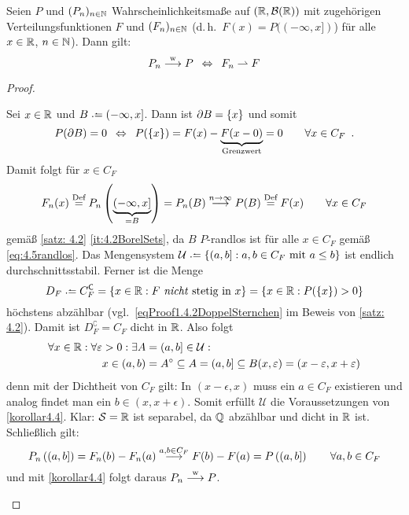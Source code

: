 \begin{korollar}\label{korollar4.5}
	Seien $P$ und $(P_n)_{n\in\mathbb{N}}$ Wahrscheinlichkeitsmaße auf $(\mathbb{R}, \mathcal{B}(\mathbb{R}))$ mit zugehörigen Verteilungsfunktionen $F$ und $(F_n)_{n\in\mathbb{N}}$ (d.\,h.\ $F(x) = P((-\infty, x])$) für alle $x \in \mathbb{R}$, $n \in \mathbb{N}$).
	Dann gilt:
	\begin{equation*}
		P_n \mathrel{\overset{\text{w}}{\longrightarrow}} P
		\enskip \Leftrightarrow \enskip
		F_n \rightharpoonup F
	\end{equation*}
\end{korollar}

\begin{proof}
	\begin{description}
		\hinrichtung
		Sei $x\in\mathbb{R}$ und $B\defeq(-\infty,x]$. Dann ist $\partial B = \left\{ x \right\}$ und somit
		\begin{equation}\label{eq:4.5randlos}
			P(\partial B) = 0
			\enskip \Leftrightarrow \enskip P(\left\{  x \right\})=F(x)-\underbrace{F(x-0)}_{\text{Grenzwert}}=0
			\qquad\forall x\in C_F \enskip \text{.}
		\end{equation}
		Damit folgt für $x\in C_F$
		\begin{equation*}
			F_n(x) \overset{\text{Def}}{=}
			P_n\left( \underbrace{(-\infty,x]}_{=B} \right)
			= P_n(B) \overset{n \to \infty}{\longrightarrow}  P(B) 
			\overset{\text{Def}}{=} F(x) \qquad\forall x\in C_F
		\end{equation*}
		gemäß \cref{satz: 4.2} \ref{it:4.2BorelSets}, da $B$ $P$-randlos ist für alle $x \in C_F$ gemäß \eqref{eq:4.5randlos}.
		\rueckrichtung
		Das Mengensystem $\mathcal{U} \defeq \menge{ (a,b] : a, b \in C_F \mit a \le b}$ ist endlich durchschnittsstabil. Ferner ist die Menge
		\begin{equation*}
			D_F \defeq C_F^\complement = \menge{ x\in\R: F\text{ \textit{nicht} stetig in }x}
			= \menge{ x\in\R:P(\menge{ x})>0}
		\end{equation*}
		höchstens abzählbar (vgl.\ \eqref{eqProof1.4.2DoppelSternchen}
		im Beweis von \cref{satz: 4.2}). Damit ist $D_F^\complement = C_F$ dicht in $\mathbb{R}$.
		Also folgt
		\begin{align*}
			\forall x\in\mathbb{R}:\forall\varepsilon>0:\exists A&=(a,b]\in \mathcal{U}:\\
			x\in (a,b)&=A^\circ\subseteq A=(a,b]\subseteq B(x,\varepsilon)=(x-\varepsilon,x+\varepsilon)
		\end{align*}
		denn mit der Dichtheit von $C_F$ gilt:
		In $(x-\epsilon,x)$ muss ein $a\in C_F$ existieren und analog findet man ein $b\in(x,x+\epsilon)$.
		Somit erfüllt $\mathcal{U}$ die Voraussetzungen von \cref{korollar4.4}.
		Klar: $\mathcal{S}=\mathbb{R}$ ist separabel, da $\mathbb{Q}$ abzählbar und dicht in $\mathbb{R}$ ist.
		Schließlich gilt:
		\begin{equation*}
			P_n\left( (a,b] \right) =
			F_n(b)-F_n(a) \overset{a,b \in C_F}{\longrightarrow} F(b)-F(a)
			=P\left( (a,b] \right) \qquad\forall a,b\in C_F
		\end{equation*}
		und mit \cref{korollar4.4} folgt daraus $P_n \mathrel{\overset{\text{w}}{\longrightarrow}} P$.
	\end{description}
\end{proof}

